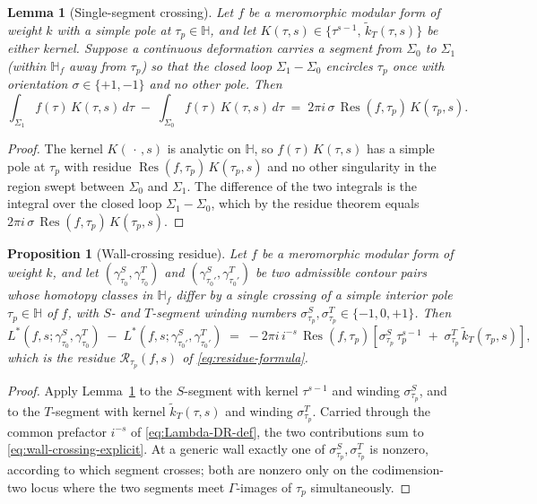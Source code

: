 \documentclass[11pt]{article}
\newtheorem{lemma}[theorem]{Lemma}
\newtheorem{proposition}[theorem]{Proposition}
\numberwithin{equation}{section}  %
\newcommand{\HH}{\mathbb{H}}
\DeclareMathOperator{\Res}{Res}
\begin{document}
\begin{lemma}[Single-segment crossing]\label{lem:segment-crossing}
Let $f$ be a meromorphic modular form of weight $k$ with a simple pole
at $\tau_p \in \HH$, and let
$K(\tau, s) \in \{\tau^{s-1},\, \widetilde{k}_T(\tau, s)\}$ be either
kernel.  Suppose a continuous deformation carries a segment from
$\Sigma_0$ to $\Sigma_1$ (within $\HH_f$ away from $\tau_p$) so that
the closed loop $\Sigma_1 - \Sigma_0$ encircles $\tau_p$ once with
orientation $\sigma \in \{+1, -1\}$ and no other pole.  Then
\begin{equation}\label{eq:segment-crossing}
  \int_{\Sigma_1}\! f(\tau)\,K(\tau, s)\,d\tau
  \;-\; \int_{\Sigma_0}\! f(\tau)\,K(\tau, s)\,d\tau
  \;=\; 2\pi i\,\sigma\,\Res(f, \tau_p)\,K(\tau_p, s).
\end{equation}
\end{lemma}
\begin{proof}
The kernel $K(\,\cdot\,, s)$ is analytic on $\HH$, so
$f(\tau)\,K(\tau, s)$ has a simple pole at $\tau_p$ with residue
$\Res(f, \tau_p)\,K(\tau_p, s)$ and no other singularity in the region
swept between $\Sigma_0$ and $\Sigma_1$.  The difference of the two
integrals is the integral over the closed loop $\Sigma_1 - \Sigma_0$,
which by the residue theorem equals
$2\pi i\,\sigma\,\Res(f, \tau_p)\,K(\tau_p, s)$.
\end{proof}

\begin{proposition}[Wall-crossing residue]\label{prop:wall-crossing-residue}
Let $f$ be a meromorphic modular form of weight $k$, and let
$(\gamma^S_{\tau_0}, \gamma^T_{\tau_0})$ and
$(\gamma^S_{\tau_0'}, \gamma^T_{\tau_0'})$ be two admissible contour
pairs whose homotopy classes in $\HH_f$ differ by a single crossing of
a simple interior pole $\tau_p \in \HH$ of $f$, with $S$- and
$T$-segment winding numbers
$\sigma^S_{\tau_p}, \sigma^T_{\tau_p} \in \{-1, 0, +1\}$.  Then
\begin{equation}\label{eq:wall-crossing-explicit}
  L^*(f, s; \gamma^S_{\tau_0}, \gamma^T_{\tau_0})
  \;-\; L^*(f, s; \gamma^S_{\tau_0'}, \gamma^T_{\tau_0'})
  \;=\; -2\pi i\,i^{-s}\,\Res(f, \tau_p)\!\left[
    \sigma^S_{\tau_p}\,\tau_p^{s-1} \;+\; \sigma^T_{\tau_p}\,\widetilde{k}_T(\tau_p, s)
  \right],
\end{equation}
which is the residue $\mathcal{R}_{\tau_p}(f, s)$ of
\eqref{eq:residue-formula}.
\end{proposition}
\begin{proof}
Apply Lemma~\ref{lem:segment-crossing} to the $S$-segment with kernel
$\tau^{s-1}$ and winding $\sigma^S_{\tau_p}$, and to the $T$-segment
with kernel $\widetilde{k}_T(\tau, s)$ and winding $\sigma^T_{\tau_p}$.
Carried through the common prefactor $i^{-s}$ of
\eqref{eq:Lambda-DR-def}, the two contributions sum to
\eqref{eq:wall-crossing-explicit}.  At a generic wall exactly one of
$\sigma^S_{\tau_p}, \sigma^T_{\tau_p}$ is nonzero, according to which
segment crosses; both are nonzero only on the codimension-two locus
where the two segments meet $\Gamma$-images of $\tau_p$ simultaneously.
\end{proof}
\end{document}
